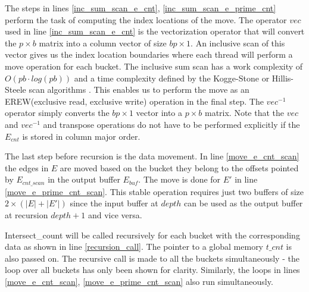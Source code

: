 \documentclass[conference]{IEEEtran}
\begin{document}
The steps in lines \ref{inc_sum_scan_e_cnt}, \ref{inc_sum_scan_e_prime_cnt} perform the task of computing the index locations of the move. The operator $vec$ used in line \ref{inc_sum_scan_e_cnt} is the vectorization operator\cite{b20} that will convert the $p \times b$ matrix into a column vector of size $bp \times 1$. An inclusive scan of this vector gives us the index location boundaries where each thread will perform a move operation for each bucket. The inclusive sum scan has a work complexity of $O(pb\cdot log(pb))$ and a time complexity defined by the Kogge-Stone or Hillis-Steele scan algorithms \cite{b14}. This enables us to perform the move as an EREW(exclusive read, exclusive write) operation in the final step. The $vec^{-1}$ operator simply converts the $bp \times 1$ vector into a $p \times b$ matrix. Note that the $vec$ and $vec^{-1}$ and transpose operations do not have to be performed explicitly if the $E_{cnt}$ is stored in column major order.

The last step before recursion is the data movement. In line \ref{move_e_cnt_scan} the edges in $E$ are moved based on the bucket they belong to the offsets pointed by $E_{cnt\_scan}$ in the output buffer $E_{buf}$. The move is done for $E'$ in line \ref{move_e_prime_cnt_scan}. This stable operation requires just two buffers of size $2\times (|E|+|E'|)$ since the input buffer at $depth$ can be used as the output buffer at recursion $depth+1$ and vice versa.

Intersect\_count will be called recursively for each bucket with the corresponding data as shown in line \ref{recursion_call}. The pointer to a global memory $t\_cnt$ is also passed on. The recursive call is made to all the buckets simultaneously - the loop over all buckets has only been shown for clarity. Similarly, the loops in lines \ref{move_e_cnt_scan}, \ref{move_e_prime_cnt_scan} also run simultaneously.


\end{document}
